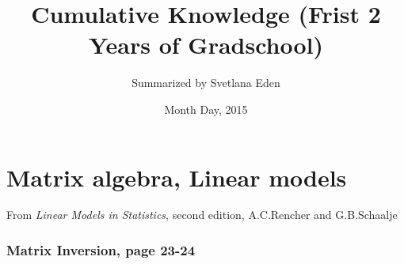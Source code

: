 \documentclass[]{article}
\title{Cumulative Knowledge (Frist 2 Years of Gradschool)}
\author{Summarized by Svetlana Eden}
\date{Month Day, 2015}
\begin{document}
\maketitle
\tableofcontents
\listoffigures
\listoftables
\clearpage

\section{Matrix algebra, Linear models}
From \emph{Linear Models in Statistics}, second edition, A.C.Rencher and G.B.Schaalje
\subsubsection{Matrix Inversion, page 23-24}
\end{document}
